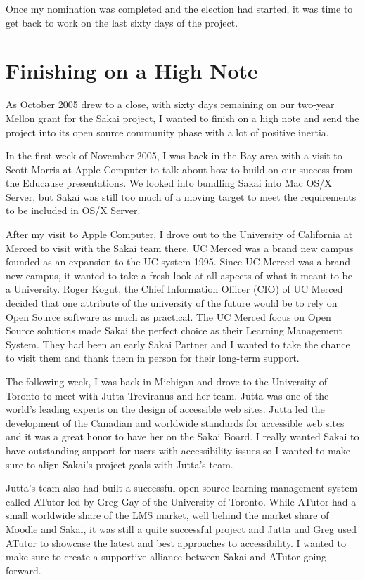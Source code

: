 \documentclass[12pt]{book}
\begin{document}
Once my nomination was completed and the election had started,
it was time to get back to work on the last sixty days of the project.

\chapter{Finishing on a High Note}

As October 2005 drew to a close, with sixty days
remaining on our two-year Mellon grant for the
Sakai project,  I wanted to
finish on a high note and send the project into its
open source community phase with a lot of positive inertia.

In the first week of November 2005, I was back in the
Bay area with a visit to Scott Morris at Apple
Computer to talk about how to build on our success from
the Educause presentations.   We looked into bundling
Sakai into Mac OS/X Server, but Sakai
was still too much of a moving target to meet the
requirements to be included in OS/X Server.

After my visit to Apple Computer, I drove out to
the University of California at Merced to visit with the Sakai
team there.  UC Merced was a brand new
campus founded as an expansion to the UC system
1995.  Since UC Merced was a brand new campus,
it wanted to take a fresh look at all aspects
of what it meant to be a University.  Roger Kogut,
the Chief Information Officer (CIO) of UC Merced
decided that one attribute of the university of
the future would be to rely on Open Source software
as much as practical.
The UC Merced focus on Open Source solutions made
Sakai the perfect choice as their Learning
Management System.  They had been an early
Sakai Partner and I wanted to take the chance to
visit them and thank them in person for their
long-term support.

The following week, I was back in Michigan
and drove to the University of Toronto to
meet with Jutta Treviranus and her team.  Jutta
was one of the world's leading experts on
the design of accessible web sites.  Jutta
led the development of the Canadian and
worldwide standards for accessible web sites
and it was a great honor to have her on the Sakai
Board.  I really wanted Sakai to have outstanding
support for users with accessibility issues so
I wanted to make sure to align Sakai's project
goals with Jutta's team.

Jutta's team also had built a successful
open source learning management system called
ATutor led by Greg Gay of the University of Toronto.
While ATutor had a small worldwide
share of the LMS market, well behind the market share
of Moodle and Sakai, it was still a quite successful
project and Jutta and Greg used ATutor to showcase
the latest and best approaches to accessibility.
I wanted to make sure to create a supportive
alliance between Sakai and ATutor going forward.
\end{document}
